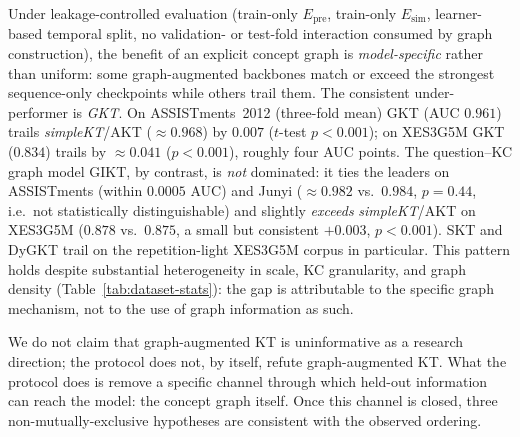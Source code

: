 \documentclass[runningheads]{llncs}
\newcommand{\Epre}{\ensuremath{E_{\text{pre}}}}
\newcommand{\Esim}{\ensuremath{E_{\text{sim}}}}
\begin{document}
Under leakage-controlled evaluation (train-only $\Epre$, train-only
$\Esim$, learner-based temporal split, no validation- or test-fold
interaction consumed by graph construction), the benefit of an explicit
concept graph is \emph{model-specific} rather than uniform: some
graph-augmented backbones match or exceed the strongest sequence-only
checkpoints while others trail them. The consistent under-performer is
\emph{GKT}. On ASSISTments~2012 (three-fold mean) GKT (AUC $0.961$) trails
\textit{simpleKT}/AKT (${\approx}0.968$) by $0.007$ ($t$-test $p{<}0.001$);
on XES3G5M GKT ($0.834$) trails by ${\approx}0.041$ ($p{<}0.001$), roughly
four AUC points. The question--KC graph model GIKT, by contrast, is
\emph{not} dominated: it ties the leaders on ASSISTments (within $0.0005$
AUC) and Junyi (${\approx}0.982$ vs.\ $0.984$, $p{=}0.44$, i.e.\ not
statistically distinguishable) and slightly \emph{exceeds}
\textit{simpleKT}/AKT on XES3G5M ($0.878$ vs.\ $0.875$, a small but
consistent $+0.003$, $p{<}0.001$). SKT and DyGKT trail on the
repetition-light XES3G5M corpus in particular. This pattern holds despite
substantial heterogeneity in scale, KC granularity, and graph density
(Table~\ref{tab:dataset-stats}): the gap is attributable to the specific
graph mechanism, not to the use of graph information as such.

We do not claim that graph-augmented KT is uninformative as a research
direction; the protocol does not, by itself, refute graph-augmented KT.
What the protocol does is remove a specific channel through which
held-out information can reach the model: the concept graph itself.
Once this channel is closed, three non-mutually-exclusive hypotheses
are consistent with the observed ordering.
\end{document}
